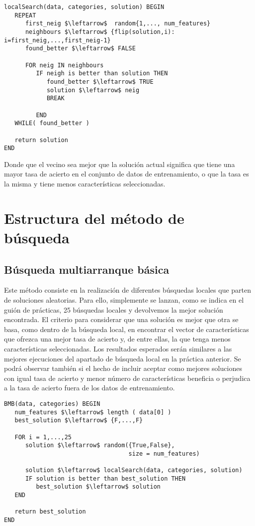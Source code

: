 \documentclass[11pt,leqno]{article}
\begin{document}
	\begin{lstlisting}[mathescape=true]
localSearch(data, categories, solution) BEGIN	
   REPEAT
      first_neig $\leftarrow$  random{1,..., num_features}
      neighbours $\leftarrow$ {flip(solution,i): i=first_neig,...,first_neig-1}
      found_better $\leftarrow$ FALSE
		
      FOR neig IN neighbours
         IF neigh is better than solution THEN
            found_better $\leftarrow$ TRUE
            solution $\leftarrow$ neig
            BREAK
		
         END
   WHILE( found_better )
	
   return solution
END
	\end{lstlisting}
	
	Donde que el vecino sea mejor que la solución actual significa que tiene una mayor tasa de acierto en el conjunto de datos de entrenamiento, o que la tasa es la misma y tiene menos características seleccionadas.

\section{Estructura del método de búsqueda}

\subsection{Búsqueda multiarranque básica}

Este método consiste en la realización de diferentes búsquedas locales que parten de soluciones aleatorias. Para ello, simplemente se lanzan, como se indica en el guión de prácticas, 25 búsquedas locales y devolvemos la mejor solución encontrada. El criterio para considerar que una solución es mejor que otra se basa, como dentro de la búsqueda local, en encontrar el vector de características que ofrezca una mejor tasa de acierto y, de entre ellas, la que tenga menos características seleccionadas. Los resultados esperados serán similares a las mejores ejecuciones del apartado de búsqueda local en la práctica anterior. Se podrá observar también si el hecho de incluir aceptar como mejores soluciones con igual tasa de acierto y menor número de características beneficia o perjudica a la tasa de acierto fuera de los datos de entrenamiento.

	\begin{lstlisting}[mathescape=true]
BMB(data, categories) BEGIN	
   num_features $\leftarrow$ length ( data[0] )
   best_solution $\leftarrow$ {F,...,F}
   
   FOR i = 1,...,25
      solution $\leftarrow$ random({True,False},
                                   size = num_features)
                                   
      solution $\leftarrow$ localSearch(data, categories, solution)
      IF solution is better than best_solution THEN
         best_solution $\leftarrow$ solution
   END
	
   return best_solution
END
	\end{lstlisting}
\end{document}
